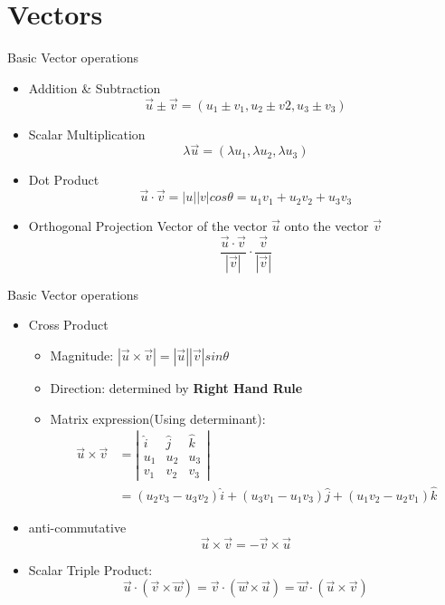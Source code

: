 \documentclass{beamer}
\begin{document}
\section{Vectors}
\begin{frame}{Basic Vector operations}
  \begin{itemize}
    \item Addition \& Subtraction\\ $$\vec{u}\pm \vec{v}=(u_1\pm v_1,u_2\pm v2,u_3\pm v_3)$$
    \item Scalar Multiplication$$\lambda \vec{u} = (\lambda u_1, \lambda u_2, \lambda u_3)$$
    \item Dot Product$$\vec{u}\cdot \vec{v} = |u||v|cos\theta=u_1v_1+u_2v_2+u_3v_3$$
    \item Orthogonal Projection Vector of the vector $\vec{u}$ onto the vector $\vec{v}$$$\frac{\vec{u}\cdot \vec{v}}{|\vec{v}|}\cdot \frac{\vec{v}}{|\vec{v}|}$$
  \end{itemize}
\end{frame}

\begin{frame}{Basic Vector operations}
  \begin{itemize}
    \item Cross Product
    \begin{itemize}
      \item Magnitude: $|\vec{u}\times \vec{v}|=|\vec{u}||\vec{v}|sin\theta$
      \item Direction: determined by \textbf{Right Hand Rule}
      \item Matrix expression(Using determinant):
      \begin{align*}
        \vec{u}\times \vec{v} &= \left|\begin{matrix}\hat{i}&\hat{j}&\hat{k}\\u_1 & u_2 & u_3\\ v_1 & v_2 & v_3 \end{matrix}\right|\\&=(u_2v_3-u_3v_2)\hat{i}+(u_3v_1-u_1v_3)\hat{j}+ (u_1v_2-u_2v_1)\hat{k}
 \end{align*}
    \end{itemize}\pause
    \item anti-commutative
    $$
    \vec{u}\times \vec{v} = -\vec{v}\times \vec{u}
    $$\pause
    \item Scalar Triple Product:$$\vec{u}\cdot(\vec{v}\times \vec{w})=\vec{v}\cdot(\vec{w}\times \vec{u})=\vec{w}\cdot(\vec{u}\times \vec{v})$$
  \end{itemize}
\end{frame}
\end{document}

